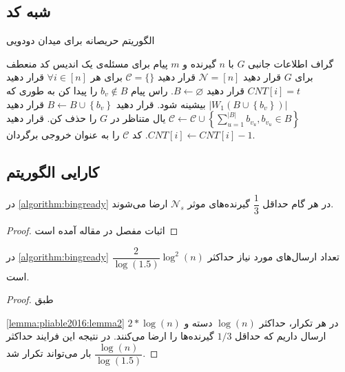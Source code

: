 \subsection{شبه کد}
	\begin{algorithm}[H]
	\caption[
	الگوریتم حریصانه برای میدان دودویی
	]{
		الگوریتم حریصانه برای میدان دودویی
		\cite{pliable2016}
		}
	\label{algorithm:bingready}
	\begin{algorithmic}[1]
		\Require
		 گراف اطلاعات جانبی
		$G$
		با 
		$n$
		گیرنده و
		$m$
		پیام برای مسئله‌ی
		\Ensure
		یک اندیس کد منعطف برای
		$G$
		\State 
		قرار دهید
		 $\mathcal{N} = [n]$
		\State
		قرار دهید
		 $\mathcal{C} = \{\}$
		\State
		برای هر
		 $\forall i \in [n]$
		 قرار دهید
		 $CNT[i] = t$ 
		\State قرار دهید
		$B \leftarrow \varnothing$.
		\State
		راس پیام
		 $b_v \notin B$
		 را پیدا کن به طوری که
		 $\left|W_1\left(B \cup\left\{b_v\right\}\right)\right|$
		 بیشینه شود.
		\State قرار دهید
		$B \leftarrow B \cup\left\{b_v\right\}$
		\EndWhile
		\State قرار دهید
		 $\mathcal{C} \leftarrow \mathcal{C} \cup\left\{\sum_{u=1}^{|B|} b_{v_u}, b_{v_u} \in B\right\}$
		\State
		یال متناظر در
		 $G$
		 را حذف کن.
		\EndIf
		\State
		قرار دهید
		 $CNT[i] \leftarrow CNT[i]-1$.
		\EndFor
		\EndWhile
		\State کد
		 $\mathcal{C}$
		 را به عنوان خروجی برگردان.
	\end{algorithmic}
\end{algorithm}


\subsection{
کارایی الگوریتم
}
\begin{lemma}
	\label{lemma:pliable2016:lemma2}
	در 
	\autoref{algorithm:bingready}
	در هر گام حداقل 
	$\dfrac{1}{3}$
	گیرنده‌های موثر
	$\mathcal{N}_s$
	ارضا می‌شوند.
\end{lemma}
\begin{proof}
	اثبات مفصل در مقاله آمده است
\end{proof}

\begin{theorem}
	\label{theorem:pliable2016:theorem1}
	در 
		\autoref{algorithm:bingready}
		تعداد ارسال‌های مورد نیاز حداکثر
		$\dfrac{2}{\log(1.5)} \log^2(n)$
		است.
\end{theorem}
\begin{proof}
	 طبق
	 
	 \autoref{lemma:pliable2016:lemma2}
	 در هر تکرار، حداکثر
	 $\log(n)$
	 دسته و
	 $2 * \log(n)$
	 ارسال داریم که حداقل
	 $1/3$
	 گیرنده‌ها را ارضا می‌کنند. در نتیجه این فرایند حداکثر
	 $\dfrac{\log(n)}{\log(1.5)}$
	 بار می‌تواند تکرار شد.
\end{proof}


